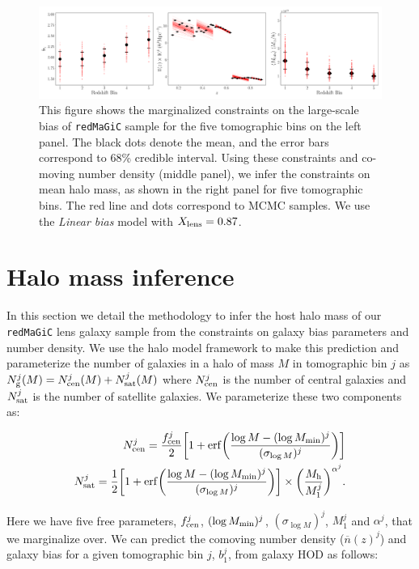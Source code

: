 \documentclass[aps, prd,twocolumn,superscriptaddress,nofootinbib,preprintnumbers]{revtex4-1}
\newcommand{\redmagic}{\texttt{redMaGiC} }
\begin{document}

\begin{figure}
\includegraphics[width=\textwidth]{figs/b1_nbar_Mh_sim_marg_wcov.pdf}
\caption[]{This figure shows the marginalized constraints on the large-scale bias of \redmagic sample for the five tomographic bins on the left panel. The black dots denote the mean, and the error bars correspond to 68\% credible interval. Using these constraints and co-moving number density (middle panel), we infer the constraints on mean halo mass, as shown in the right panel for five tomographic bins. The red line and dots correspond to MCMC samples. We use the \textit{Linear bias} model with $X_{\rm lens}=0.87$.  }
\label{fig:b1_nbar_Mh}
\end{figure}

\section{Halo mass inference}
\label{app:halo_mass}
In this section we detail the methodology to infer the host halo mass of our \redmagic lens galaxy sample from the constraints on galaxy bias parameters and number density. We use the halo model framework to make this prediction and parameterize the number of galaxies in a halo of mass $M$ in tomographic bin $j$ as $N^{j}_{\rm g}(M) = N^{j}_{\rm{cen}}(M) + N^{j}_{\rm{sat}}(M)$ where $N^{j}_{\rm{cen}}$ is the number of central galaxies and $N^{j}_{\rm{sat}}$ is the number of satellite galaxies. We parameterize these two components as:
\begin{linenomath*}
\begin{align}
    N^{j}_{\rm cen} =  \frac{f^{j}_{\rm cen}}{2} \bigg[1 + {\rm erf}\bigg(\frac{ \log{M} - (\log{M_{\rm min}})^j}{(\sigma_{\log{M}})^j} \bigg) \bigg]  \\
    N^j_{\rm sat} = \frac{1}{2} \bigg[1 + {\rm erf}\bigg(\frac{ \log{M} - (\log{M_{\rm min}})^j}{(\sigma_{\log{M}})^j} \bigg) \bigg] \times \bigg( \frac{M_{\rm h}}{M^j_1} \bigg)^{\alpha^j}.
\end{align}
\end{linenomath*}
Here we have five free parameters, $f^j_{\rm cen}$, $(\log{M_{\rm min}})^j$, $(\sigma_{\log{M}})^j$, $M^j_1$ and $\alpha^j$, that we marginalize over. We can predict the comoving number density ($\overline{n}(z)^j$) and galaxy bias for a given tomographic bin $j$, $b^j_1$, from galaxy HOD as follows:
\end{document}
